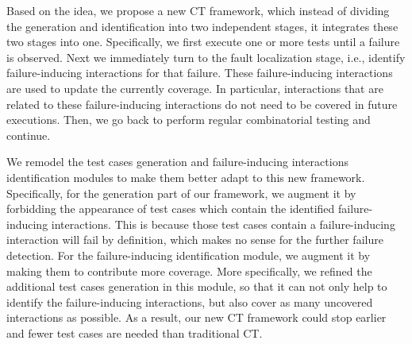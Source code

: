 \documentclass{sig-alternate}
\begin{document}
Based on the idea, we propose a new CT framework, which instead of dividing the generation and identification into two independent stages, it integrates these two stages into one. Specifically, we first execute one or more tests until a failure is observed. Next we immediately turn to the fault localization stage, i.e., identify failure-inducing interactions for that failure. These failure-inducing interactions are used to update the currently coverage. In particular, interactions that are related to these failure-inducing interactions do not need to be covered in future executions. Then, we go back to perform regular combinatorial testing and continue.

We remodel the test cases generation and failure-inducing interactions identification modules to make them better adapt to this new framework. Specifically, for the generation part of our framework, we augment it by forbidding the appearance of test cases which contain the identified failure-inducing interactions. This is because those test cases contain a failure-inducing interaction will fail by definition, which  makes no sense for the further failure detection. For the failure-inducing identification module, we augment it by making them to contribute more coverage.  More specifically, we refined the additional test cases generation in this module, so that it can not only help to identify the failure-inducing interactions, but also cover as many uncovered interactions as possible. As a result, our new CT framework could stop earlier and fewer test cases are needed than traditional CT.


%
%
%
\end{document}
